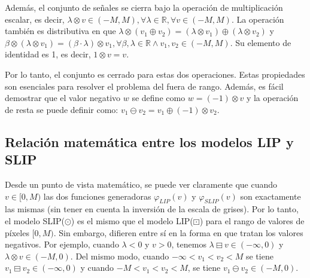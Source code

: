 Además, el conjunto de señales se cierra bajo la operación de multiplicación escalar, es decir, $\lambda \otimes v \in (-M, M), \forall \lambda \in \mathbb{R}, \forall v \in (-M, M)$. La operación también es distributiva en que $\lambda \otimes (v_1\oplus v_2) = (\lambda \otimes v_1 )\oplus (\lambda\otimes v_2)$ y $\beta\otimes (\lambda\otimes v_1 ) = (\beta \cdot \lambda)\otimes v_1, \forall \beta, \lambda \in \mathbb{R} \land v_1 , v_2 \in (-M, M)$. Su elemento de identidad es 1, es decir, $1\otimes v = v $.

Por lo tanto, el conjunto es cerrado para estas dos operaciones. Estas propiedades son esenciales para resolver el problema del fuera de rango. Además, es fácil demostrar que el valor negativo $w$ se define como $w = (-1)\otimes v$ y la operación de resta se puede definir como: $v_1\ominus v_2=v_1\oplus(-1)\otimes v_2$.

\subsection{Relación matemática entre los modelos LIP y SLIP}

Desde un punto de vista matemático, se puede ver claramente que cuando $v \in [0, M)$ las dos funciones generadoras $\varphi_{LIP}(v)$ y $\varphi_{SLIP}(v)$ son exactamente las mismas (sin tener en cuenta la inversi\'on de la escala de grises). Por lo tanto, el modelo SLIP($\odot$) es el mismo que el modelo LIP($\boxdot$) para el rango de valores de píxeles $[0, M)$. Sin embargo, difieren entre sí en la forma en que tratan los valores negativos.  Por ejemplo, cuando $\lambda < 0$ y $v > 0$, tenemos $\lambda\boxminus v \in (-\infty, 0)$ y $\lambda \otimes v \in (-M, 0)$. Del mismo modo, cuando $-\infty < v_1 < v_2 < M$ se tiene $v_1 \boxminus v_2 \in (-\infty, 0)$ y cuando $-M < v_1 < v_2 < M$, se tiene $v_1\ominus v_2 \in (-M, 0)$. 
